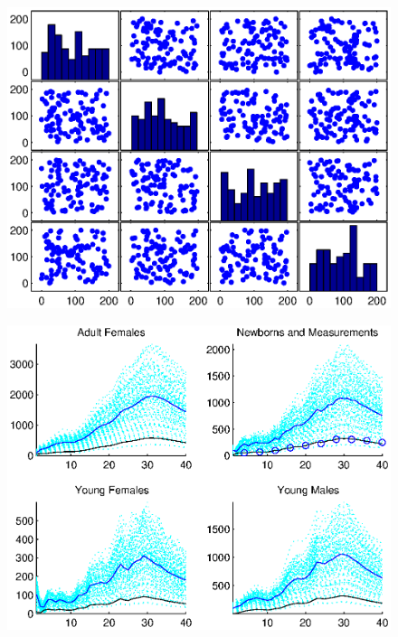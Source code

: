 \documentclass[fleqn, letterpaper]{amsart}
\begin{document}
\begin{figure}
\includegraphics[width=1\textwidth]{rinitcov}
\end{figure}
\begin{figure}
\includegraphics[width=1\textwidth]{ropenloop}
\end{figure}
\end{document}
